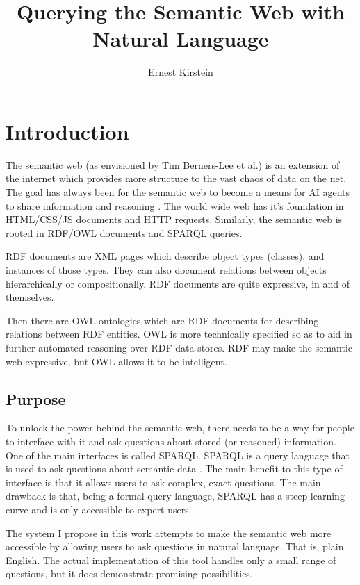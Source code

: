 \documentclass[11pt]{article}
\begin{document}
\title{Querying the Semantic Web with Natural Language}
\author{Ernest Kirstein}
\maketitle

\tableofcontents

\section{Introduction}
The semantic web (as envisioned by Tim Berners-Lee et al.) is an extension of
the internet which provides more structure to the vast chaos of data on the
net. The goal has always been for the semantic web to become
a means for AI agents to share information and reasoning \cite{semantic}.
The world wide web has it's foundation in HTML/CSS/JS documents and HTTP requests.
Similarly, the semantic web is rooted in RDF/OWL documents and SPARQL queries.

RDF documents are XML pages which
describe object types (classes), and instances of those types. 
They can also document relations between objects hierarchically or compositionally. 
RDF documents are quite expressive, in and of themselves. 

Then there are OWL ontologies which are RDF documents for describing relations
between RDF entities\cite{owl}. OWL is more technically specified so as to
aid in further automated reasoning
over RDF data stores. RDF may make the semantic web expressive, but OWL
allows it to be intelligent.

\subsection{Purpose}

To unlock the power behind the semantic web, there needs to be a way for people
to interface with it and ask questions about stored (or reasoned) information. 
One of the main interfaces is called SPARQL. 
SPARQL is a query language that is used to ask questions about semantic
data \cite{sparql}. The main benefit to this type of interface is that it allows users to ask
complex, exact questions. The main drawback is that, being a formal query language,
SPARQL has a steep learning curve and is only accessible to expert users.

The system I propose in this work attempts to make the semantic web more accessible
by allowing users to ask questions in natural language. That is, plain English.
The actual implementation of this tool handles only a small range of questions,
but it does demonstrate promising possibilities.
\end{document}
